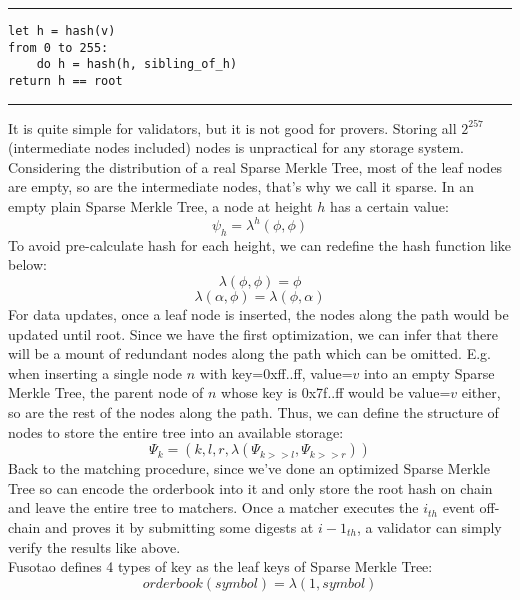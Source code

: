 \documentclass[a4paper,12pt]{article}
\begin{document}
\noindent\rule{\textwidth}{0.5pt}
\begin{verbatim}
let h = hash(v)
from 0 to 255:
    do h = hash(h, sibling_of_h)
return h == root
\end{verbatim}
\noindent\rule{\textwidth}{0.5pt}
It is quite simple for validators, but it is not good for provers. Storing all \(2^{257}\) (intermediate nodes included) nodes is unpractical for any storage system. Considering the distribution of a real Sparse Merkle Tree, most of the leaf nodes are empty, so are the intermediate nodes, that’s why we call it sparse. In an empty plain Sparse Merkle Tree, a node at height \(h\) has a certain value:\\
\begin{equation*}
    \psi_{h} = \lambda^{h}(\phi, \phi)
\end{equation*}
To avoid pre-calculate hash for each height, we can redefine the hash function like below:\\
\begin{equation*}
    \lambda(\phi, \phi) = \phi
\end{equation*}
\begin{equation*}
    \lambda(\alpha, \phi) = \lambda(\phi, \alpha)
\end{equation*}
For data updates, once a leaf node is inserted, the nodes along the path would be updated until root. Since we have the first optimization, we can infer that there will be a mount of redundant nodes along the path which can be omitted. E.g. when inserting a single node \(n\) with key=0xff..ff, value=\(v\) into an empty Sparse Merkle Tree, the parent node of \(n\) whose key is 0x7f..ff would be value=\(v\) either, so are the rest of the nodes along the path. Thus, we can define the structure of nodes to store the entire tree into an available storage:\\
\begin{equation*}
    \Psi_{k} = (k, l, r, \lambda(\Psi_{k>>l}, \Psi_{k>>r}))
\end{equation*}
Back to the matching procedure, since we've done an optimized Sparse Merkle Tree so can encode the orderbook into it and only store the root hash on chain and leave the entire tree to matchers. Once a matcher executes the \(i_{th}\) event off-chain and proves it by submitting some digests at \(i-1_{th}\), a validator can simply verify the results like above.\\
Fusotao defines 4 types of key as the leaf keys of Sparse Merkle Tree:\\
\begin{equation*}
    orderbook(symbol) = \lambda(1, symbol)
\end{equation*}
\end{document}
